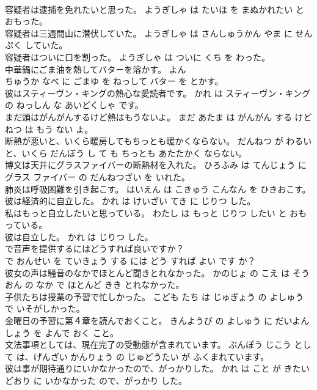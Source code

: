\documentclass[8pt]{extreport}
\begin{document}
\begin{CJK}{UTF8}{min}
\\	容疑者は逮捕を免れたいと思った。	ようぎしゃ は たいほ を まぬかれたい と おもった。	
\\	容疑者は三週間山に潜伏していた。	ようぎしゃ は さんしゅうかん やま に せんぷく していた。	
\\	容疑者はついに口を割った。	ようぎしゃ は ついに くち を わった。	
\\	中華鍋にごま油を熱してバターを溶かす。	よん 
\\	ちゅうか なべ に ごまゆ を ねっして バター を とかす。	
\\	彼はスティーヴン・キングの熱心な愛読者です。	かれ は スティーヴン・キング の ねっしん な あいどくしゃ です。	
\\	まだ頭はがんがんするけど熱はもうないよ。	まだ あたま は がんがん する けど ねつ は もう ない よ。	
\\	断熱が悪いと、いくら暖房してもちっとも暖かくならない。	だんねつ が わるい と、いくら だんぼう し て も ちっとも あたたかく ならない。	
\\	博文は天井にグラスファイバーの断熱材を入れた。	ひろふみ は てんじょう に グラス ファイバー の だんねつざい を いれた。	
\\	肺炎は呼吸困難を引き起こす。	はいえん は こきゅう こんなん を ひきおこす。	
\\	彼は経済的に自立した。	かれ は けいざい てき に じりつ した。	
\\	私はもっと自立したいと思っている。	わたし は もっと じりつ したい と おもっている。	
\\	彼は自立した。	かれ は じりつ した。	
\\	で音声を提供するにはどうすれば良いですか？	
\\	で おんせい を ていきょう する には どう すれば よい です か？	
\\	彼女の声は騒音のなかでほとんど聞きとれなかった。	かのじょ の こえ は そうおん の なか で ほとんど きき とれなかった。	
\\	子供たちは授業の予習で忙しかった。	こども たち は じゅぎょう の よしゅう で いそがしかった。	
\\	金曜日の予習に第４章を読んでおくこと。	きんようび の よしゅう に だいよんしょう を よんで おく こと。	
\\	文法事項としては、現在完了の受動態が含まれています。	ぶんぽう じこう として は、げんざい かんりょう の じゅどうたい が ふくまれています。	
\\	彼は事が期待通りにいかなかったので、がっかりした。	かれ は こと が きたいどおり に いかなかった ので、がっかり した。	

\end{CJK}
\end{document}
